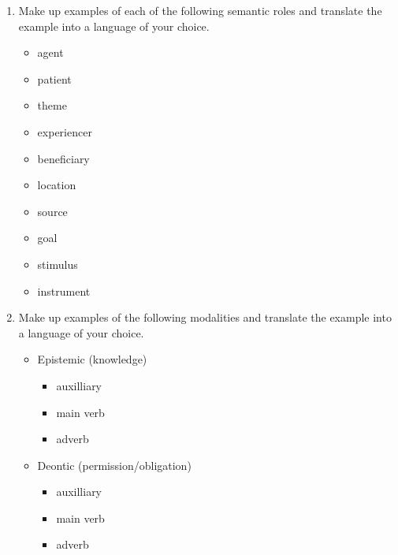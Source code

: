 \documentclass[a4paper]{article}
\begin{document}
\begin{enumerate}
\item Make up examples of each of the following semantic roles and translate the example into a language of your choice.
  \begin{itemize}
  \item agent
  \item patient
  \item theme
  \item experiencer
  \item beneficiary
  \item location
  \item source
  \item goal
  \item stimulus
  \item instrument
  \end{itemize}
\item  Make up examples of the following modalities and translate the example into a language of your choice.
  \begin{itemize}
  \item Epistemic (knowledge)
    \begin{itemize}
    \item auxilliary
    \item main verb
    \item adverb
    \end{itemize}
  \item Deontic (permission/obligation)
    \begin{itemize}
    \item auxilliary
    \item main verb
    \item adverb
    \end{itemize}
  \end{itemize}
\end{enumerate}
\end{document}

